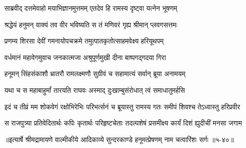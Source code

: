 \twolineshloka
{साब्रवीद् दत्तमेवाहो मयाभिज्ञानमुत्तमम्}
{एतदेव हि रामस्य दृष्ट्वा यत्नेन भूषणम्} %

\twolineshloka
{श्रद्धेयं हनुमन् वाक्यं तव वीर भविष्यति}
{स तं मणिवरं गृह्य श्रीमान् प्लवगसत्तमः} %

\twolineshloka
{प्रणम्य शिरसा देवीं गमनायोपचक्रमे}
{तमुत्पातकृतोत्साहमवेक्ष्य हरियूथपम्} %

\twolineshloka
{वर्धमानं महावेगमुवाच जनकात्मजा}
{अश्रुपूर्णमुखी दीना बाष्पगद्गदया गिरा} %

\twolineshloka
{हनूमन् सिंहसंकाशौ भ्रातरौ रामलक्ष्मणौ}
{सुग्रीवं च सहामात्यं सर्वान् ब्रूया अनामयम्} %

\twolineshloka
{यथा च स महाबाहुर्मां तारयति राघवः}
{अस्माद् दुःखाम्बुसंरोधात् त्वं समाधातुमर्हसि} %

\twolineshloka
{इदं च तीव्रं मम शोकवेगं रक्षोभिरेभिः परिभर्त्सनं च}
{ब्रूयास्तु रामस्य गतः समीपं शिवश्च तेऽध्वास्तु हरिप्रवीर} %

\twolineshloka
{स राजपुत्र्या प्रतिवेदितार्थः कपिः कृतार्थः परिहृष्टचेताः}
{तदल्पशेषं प्रसमीक्ष्य कार्यं दिशं ह्युदीचीं मनसा जगाम} %


॥इत्यार्षे श्रीमद्रामायणे वाल्मीकीये आदिकाव्ये सुन्दरकाण्डे हनूमत्प्रेषणम् नाम चत्वारिंशः सर्गः ॥५-४०॥
